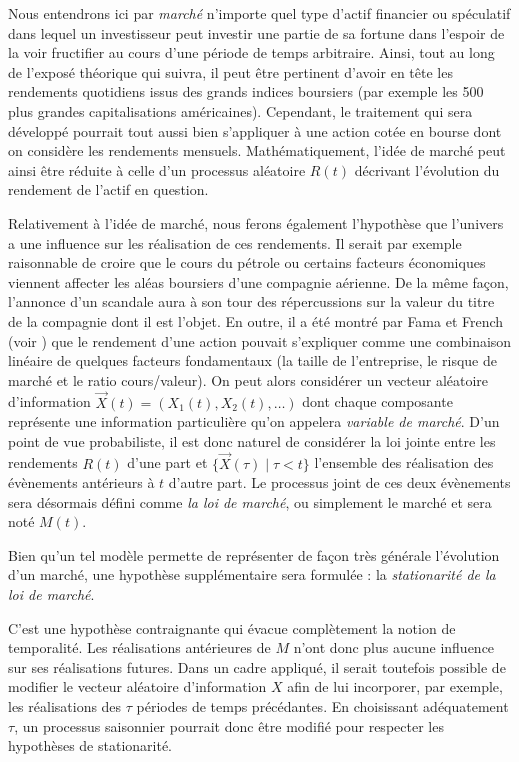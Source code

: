 Nous entendrons ici par \textit{marché} n'importe quel type d'actif financier ou
spéculatif dans lequel un investisseur peut investir une partie de sa fortune dans
l'espoir de la voir fructifier au cours d'une période de temps arbitraire. Ainsi, tout au
long de l'exposé théorique qui suivra, il peut être pertinent d'avoir en tête les
rendements quotidiens issus des grands indices boursiers (par exemple les 500 plus grandes
capitalisations américaines). Cependant, le traitement qui sera développé pourrait tout
aussi bien s'appliquer à une action cotée en bourse dont on considère les rendements
mensuels.  Mathématiquement, l'idée de marché peut ainsi être réduite à celle d'un
processus aléatoire $R(t)$ décrivant l'évolution du rendement de l'actif en question.

Relativement à l'idée de marché, nous ferons également l'hypothèse que l'univers a une
influence sur les réalisation de ces rendements. Il serait par exemple raisonnable de
croire que le cours du pétrole ou certains facteurs économiques viennent affecter les
aléas boursiers d'une compagnie aérienne. De la même façon, l'annonce d'un scandale aura à
son tour des répercussions sur la valeur du titre de la compagnie dont il est l'objet. En
outre, il a été montré par Fama et French (voir \cite{fama1996multifactor}) que le
rendement d'une action pouvait s'expliquer comme une combinaison linéaire de quelques
facteurs fondamentaux (la taille de l'entreprise, le risque de marché et le ratio
cours/valeur). On peut alors considérer un vecteur aléatoire d'information
$\vec X(t) = (X_1(t), X_2(t), \dots)$ dont chaque composante représente une information
particulière qu'on appelera \textit{variable de marché}. D'un point de vue probabiliste,
il est donc naturel de considérer la loi jointe entre les rendements $R(t)$ d'une part et
$\{\vec X(\tau) \mid \tau < t\}$ l'ensemble des réalisation des évènements antérieurs à
$t$ d'autre part. Le processus joint de ces deux évènements sera désormais défini comme
\textit{la loi de marché}, ou simplement le marché et sera noté $M(t)$.


Bien qu'un tel modèle permette de représenter de façon très générale l'évolution d'un
marché, une hypothèse supplémentaire sera formulée : la \textit{stationarité de la loi de
  marché}.

C'est une hypothèse contraignante qui évacue complètement la notion de temporalité. Les
réalisations antérieures de $M$ n'ont donc plus aucune influence sur ses réalisations
futures. Dans un cadre appliqué, il serait toutefois possible de modifier le vecteur
aléatoire d'information $X$ afin de lui incorporer, par exemple, les réalisations des
$\tau$ périodes de temps précédantes. En choisissant adéquatement $\tau$, un processus
saisonnier pourrait donc être modifié pour respecter les hypothèses de stationarité.


